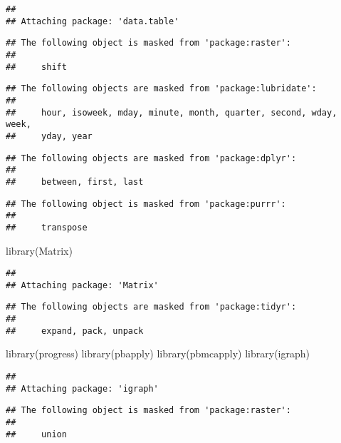 \documentclass[
]{article}
\newenvironment{Shaded}{\begin{snugshade}}{\end{snugshade}}
\newcommand{\FunctionTok}[1]{\textcolor[rgb]{0.00,0.00,0.00}{#1}}
\newcommand{\NormalTok}[1]{#1}
\begin{document}
\begin{verbatim}
## 
## Attaching package: 'data.table'
\end{verbatim}

\begin{verbatim}
## The following object is masked from 'package:raster':
## 
##     shift
\end{verbatim}

\begin{verbatim}
## The following objects are masked from 'package:lubridate':
## 
##     hour, isoweek, mday, minute, month, quarter, second, wday, week,
##     yday, year
\end{verbatim}

\begin{verbatim}
## The following objects are masked from 'package:dplyr':
## 
##     between, first, last
\end{verbatim}

\begin{verbatim}
## The following object is masked from 'package:purrr':
## 
##     transpose
\end{verbatim}

\begin{Shaded}
\begin{Highlighting}[]
\FunctionTok{library}\NormalTok{(Matrix)}
\end{Highlighting}
\end{Shaded}

\begin{verbatim}
## 
## Attaching package: 'Matrix'
\end{verbatim}

\begin{verbatim}
## The following objects are masked from 'package:tidyr':
## 
##     expand, pack, unpack
\end{verbatim}

\begin{Shaded}
\begin{Highlighting}[]
\FunctionTok{library}\NormalTok{(progress)}
\FunctionTok{library}\NormalTok{(pbapply)}
\FunctionTok{library}\NormalTok{(pbmcapply)}
\FunctionTok{library}\NormalTok{(igraph)}
\end{Highlighting}
\end{Shaded}

\begin{verbatim}
## 
## Attaching package: 'igraph'
\end{verbatim}

\begin{verbatim}
## The following object is masked from 'package:raster':
## 
##     union
\end{verbatim}
\end{document}
